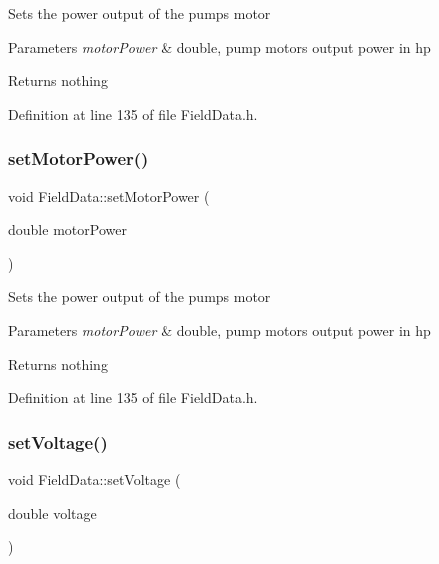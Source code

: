 Sets the power output of the pump\textquotesingle{}s motor


\begin{DoxyParams}{Parameters}
{\em motor\+Power} & double, pump motor\textquotesingle{}s output power in hp\\
\hline
\end{DoxyParams}
\begin{DoxyReturn}{Returns}
nothing 
\end{DoxyReturn}


Definition at line 135 of file Field\+Data.\+h.

\mbox{\label{class_field_data_a078e6b4899e7046008ccc9de59bd0272}} 
\subsubsection{\texorpdfstring{set\+Motor\+Power()}{setMotorPower()}\hspace{0.1cm}{\footnotesize\ttfamily [3/3]}}
{\footnotesize\ttfamily void Field\+Data\+::set\+Motor\+Power (\begin{DoxyParamCaption}\item[{double}]{motor\+Power }\end{DoxyParamCaption})\hspace{0.3cm}{\ttfamily [inline]}}

Sets the power output of the pump\textquotesingle{}s motor


\begin{DoxyParams}{Parameters}
{\em motor\+Power} & double, pump motor\textquotesingle{}s output power in hp\\
\hline
\end{DoxyParams}
\begin{DoxyReturn}{Returns}
nothing 
\end{DoxyReturn}


Definition at line 135 of file Field\+Data.\+h.

\mbox{\label{class_field_data_a02735cc6956a3fce97bab645ef15dabc}} 
\subsubsection{\texorpdfstring{set\+Voltage()}{setVoltage()}\hspace{0.1cm}{\footnotesize\ttfamily [1/3]}}
{\footnotesize\ttfamily void Field\+Data\+::set\+Voltage (\begin{DoxyParamCaption}\item[{double}]{voltage }\end{DoxyParamCaption})\hspace{0.3cm}{\ttfamily [inline]}}

